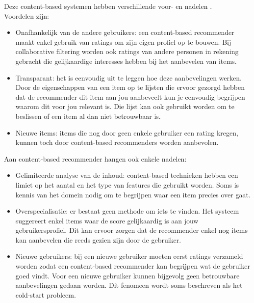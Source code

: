 Deze content-based systemen hebben verschillende voor- en nadelen \cite{Bogers2009b}. \\Voordelen zijn:
\begin{itemize}
\item Onafhankelijk van de andere gebruikers: een content-based recommender maakt enkel gebruik van ratings om zijn eigen profiel op te bouwen. Bij collaborative filtering worden ook ratings van andere personen in rekening gebracht die gelijkaardige interesses hebben bij het aanbevelen van items. 
\item Transparant: het is eenvoudig uit te leggen hoe deze aanbevelingen werken. Door de eigenschappen van een item op te lijsten die ervoor gezorgd hebben dat de recommender dit item aan jou aanbeveelt kun je eenvoudig begrijpen waarom dit voor jou relevant is. Die lijst kan ook gebruikt worden om te beslissen of een item al dan niet betrouwbaar is.
\item Nieuwe items: items die nog door geen enkele gebruiker een rating kregen, kunnen toch door content-based recommenders worden aanbevolen.
\end{itemize}

\newpage
Aan content-based recommender hangen ook enkele nadelen:
\begin{itemize}
\item Gelimiteerde analyse van de inhoud: content-based technieken hebben een limiet op het aantal en het type van features die gebruikt worden. Soms is kennis van het domein nodig om te begrijpen waar een item precies over gaat. 
\item Overspecialisatie: er bestaat geen methode om iets  te vinden. Het systeem suggereert enkel items waar de score gelijkaardig is aan jouw gebruikersprofiel. Dit kan ervoor zorgen dat de recommender enkel nog items kan aanbevelen die reeds gezien zijn door de gebruiker. 
\item Nieuwe gebruikers: bij een nieuwe gebruiker moeten eerst ratings verzameld worden zodat een content-based recommender kan begrijpen wat de gebruiker goed vindt. Voor een nieuwe gebruiker kunnen bijgevolg geen betrouwbare aanbevelingen gedaan worden. Dit fenomeen wordt soms beschreven als het cold-start probleem.
\end{itemize}



